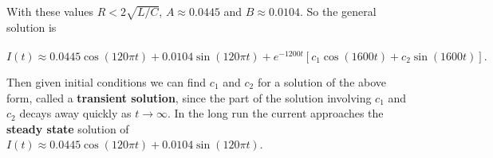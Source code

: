 \documentclass{ximera}
\begin{document}
\bigskip

  With these values $R<2\sqrt{L/C}$, $A\approx 0.0445$ and $B\approx 0.0104$.  So the general solution is \\ \\ $$I(t)\approx 0.0445\cos{(120\pi t)}+0.0104\sin{(120\pi t)}+e^{-1200t}\left[c_{1}\cos{\left(1600t\right)}+c_{2}\sin{\left(1600t\right)}\right].$$


 Then given initial conditions we can find $c_{1}$ and $c_{2}$ for a solution of the above form, called a \textbf{transient solution}, since the part of the solution involving $c_{1}$ and $c_{2}$ decays away quickly as $t\rightarrow \infty$.  In the long run the current approaches the \textbf{steady state} solution of \\ $I(t)\approx 0.0445\cos{(120\pi t)}+0.0104\sin{(120\pi t)}$.
\end{document}
